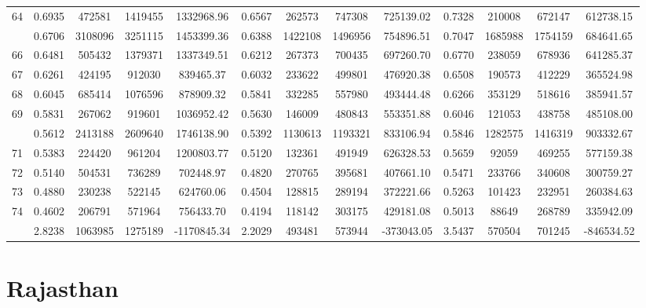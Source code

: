 \documentclass[
  12pt,
]{article}
\begin{document}
\begin{longtable}[t]{lcccccccccccc}
64 & 0.6935 & 472581 & 1419455 & 1332968.96 & 0.6567 & 262573 & 747308 & 725139.02 & 0.7328 & 210008 & 672147 & 612738.15\\
\addlinespace
65 & 0.6706 & 3108096 & 3251115 & 1453399.36 & 0.6388 & 1422108 & 1496956 & 754896.51 & 0.7047 & 1685988 & 1754159 & 684641.65\\
66 & 0.6481 & 505432 & 1379371 & 1337349.51 & 0.6212 & 267373 & 700435 & 697260.70 & 0.6770 & 238059 & 678936 & 641285.37\\
67 & 0.6261 & 424195 & 912030 & 839465.37 & 0.6032 & 233622 & 499801 & 476920.38 & 0.6508 & 190573 & 412229 & 365524.98\\
68 & 0.6045 & 685414 & 1076596 & 878909.32 & 0.5841 & 332285 & 557980 & 493444.48 & 0.6266 & 353129 & 518616 & 385941.57\\
69 & 0.5831 & 267062 & 919601 & 1036952.42 & 0.5630 & 146009 & 480843 & 553351.88 & 0.6046 & 121053 & 438758 & 485108.00\\
\addlinespace
70 & 0.5612 & 2413188 & 2609640 & 1746138.90 & 0.5392 & 1130613 & 1193321 & 833106.94 & 0.5846 & 1282575 & 1416319 & 903332.67\\
71 & 0.5383 & 224420 & 961204 & 1200803.77 & 0.5120 & 132361 & 491949 & 626328.53 & 0.5659 & 92059 & 469255 & 577159.38\\
72 & 0.5140 & 504531 & 736289 & 702448.97 & 0.4820 & 270765 & 395681 & 407661.10 & 0.5471 & 233766 & 340608 & 300759.27\\
73 & 0.4880 & 230238 & 522145 & 624760.06 & 0.4504 & 128815 & 289194 & 372221.66 & 0.5263 & 101423 & 232951 & 260384.63\\
74 & 0.4602 & 206791 & 571964 & 756433.70 & 0.4194 & 118142 & 303175 & 429181.08 & 0.5013 & 88649 & 268789 & 335942.09\\
\addlinespace
75 & 2.8238 & 1063985 & 1275189 & -1170845.34 & 2.2029 & 493481 & 573944 & -373043.05 & 3.5437 & 570504 & 701245 & -846534.52\\*
\end{longtable}
\endgroup{}

\pagebreak

\hypertarget{rajasthan}{%
\section{Rajasthan}\label{rajasthan}}

\begingroup\fontsize{9.7}{11.7}\selectfont
\end{document}
